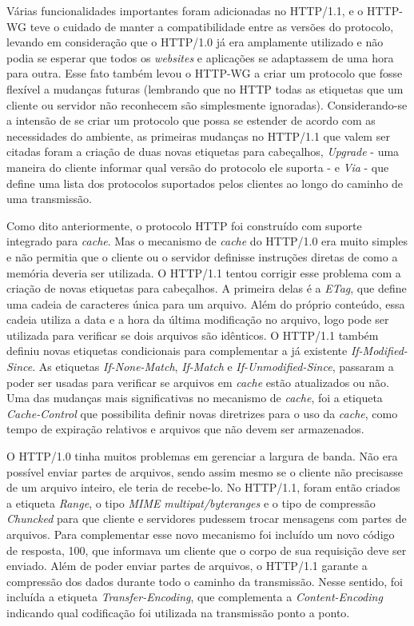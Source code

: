 Várias funcionalidades importantes foram adicionadas no HTTP/1.1, e o HTTP-WG teve o cuidado de manter a compatibilidade entre as versões do protocolo, levando em consideração que o HTTP/1.0 já era amplamente utilizado e não podia se esperar que todos os \textit{websites} e aplicações se adaptassem de uma hora para outra. Esse fato também levou o HTTP-WG a criar um protocolo que fosse flexível a mudanças futuras (lembrando que no HTTP todas as etiquetas que um cliente ou servidor não reconhecem são simplesmente ignoradas). Considerando-se a intensão de se criar um protocolo que possa se estender de acordo com as necessidades do ambiente, as primeiras mudanças no HTTP/1.1 que valem ser citadas foram a criação de duas novas etiquetas para cabeçalhos, \textit{Upgrade} - uma maneira do cliente informar qual versão do protocolo ele suporta - e \textit{Via} - que define uma lista dos protocolos suportados pelos clientes ao longo do caminho de uma transmissão.

Como dito anteriormente, o protocolo HTTP foi construído com suporte integrado para \textit{cache}. Mas o mecanismo de \textit{cache} do HTTP/1.0 era muito simples e não permitia que o cliente ou o servidor definisse instruções diretas de como a memória deveria ser utilizada. O HTTP/1.1 tentou corrigir esse problema com a criação de novas etiquetas para cabeçalhos. A primeira delas é a \textit{ETag}, que define uma cadeia de caracteres única para um arquivo. Além do próprio conteúdo, essa cadeia utiliza a data e a hora da última modificação no arquivo, logo pode ser utilizada para verificar se dois arquivos são idênticos. O HTTP/1.1 também definiu novas etiquetas condicionais para complementar a já existente \textit{If-Modified-Since}. As etiquetas \textit{If-None-Match}, \textit{If-Match} e \textit{If-Unmodified-Since}, passaram a poder ser usadas para verificar se arquivos em \textit{cache} estão atualizados ou não. Uma das mudanças mais significativas no mecanismo de \textit{cache}, foi a etiqueta \textit{Cache-Control} que possibilita definir novas diretrizes para o uso da \textit{cache}, como tempo de expiração relativos e arquivos que não devem ser armazenados.

O HTTP/1.0 tinha muitos problemas em gerenciar a largura de banda. Não era possível enviar partes de arquivos, sendo assim mesmo se o cliente não precisasse de um arquivo inteiro, ele teria de recebe-lo. No HTTP/1.1, foram então criados a etiqueta \textit{Range}, o tipo \textit{MIME} \textit{multipat/byteranges} e o tipo de compressão \textit{Chuncked} para que cliente e servidores pudessem trocar mensagens com partes de arquivos. Para complementar esse novo mecanismo foi incluído um novo código de resposta, 100, que informava um cliente que o corpo de sua requisição deve ser enviado. Além de poder enviar partes de arquivos, o HTTP/1.1 garante a compressão dos dados durante todo o caminho da transmissão. Nesse sentido, foi incluída a etiqueta \textit{Transfer-Encoding}, que complementa a \textit{Content-Encoding} indicando qual codificação foi utilizada na transmissão ponto a ponto.

